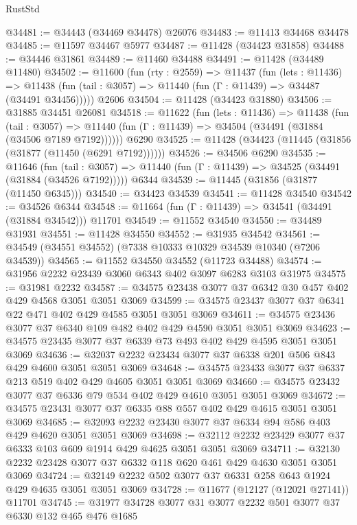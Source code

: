 \begin{lexlean}{RustStd}
\begin{coremodule}
@34481 := @34443 (@34469 @34478) @26076
@34483 := @11413 @34468 @34478
@34485 := @11597 @34467 @5977
@34487 := @11428 (@34423 @31858)
@34488 := @34446 @31861
@34489 := @11460 @34488
@34491 := @11428 (@34489 @11480)
@34502 := @11600
    (fun (rty : @2559) =>
    @11437
      (fun (lets : @11436) =>
      @11438 (fun (tail : @3057) => @11440 (fun (Γ : @11439) => @34487 (@34491 @34456)))))
    @2606
@34504 := @11428 (@34423 @31880)
@34506 := @31885 @34451 @26081
@34518 := @11622
    (fun (lets : @11436) =>
    @11438
      (fun (tail : @3057) =>
      @11440 (fun (Γ : @11439) => @34504 (@34491 (@31884 (@34506 @7189 @7192))))))
    @6290
@34525 := @11428 (@34423 (@11445 (@31856 (@31877 (@11450 (@6291 @7192))))))
@34526 := @34506 @6290
@34535 := @11646
    (fun (tail : @3057) => @11440 (fun (Γ : @11439) => @34525 (@34491 (@31884 (@34526 @7192)))))
    @6344
@34539 := @11445 (@31856 (@31877 (@11450 @6345)))
@34540 := @34423 @34539
@34541 := @11428 @34540
@34542 := @34526 @6344
@34548 := @11664 (fun (Γ : @11439) => @34541 (@34491 (@31884 @34542))) @11701
@34549 := @11552 @34540
@34550 := @34489 @31931
@34551 := @11428 @34550
@34552 := @31935 @34542
@34561 := @34549 (@34551 @34552) (@7338 @10333 @10329 @34539 @10340 (@7206 @34539))
@34565 := @11552 @34550 @34552 (@11723 @34488)
@34574 := @31956 @2232 @23439 @3060 @6343 @402 @3097 @6283 @3103 @31975
@34575 := @31981 @2232
@34587 := @34575 @23438 @3077 @37 @6342 @30 @457 @402 @429 @4568 @3051 @3051 @3069
@34599 := @34575 @23437 @3077 @37 @6341 @22 @471 @402 @429 @4585 @3051 @3051 @3069
@34611 := @34575 @23436 @3077 @37 @6340 @109 @482 @402 @429 @4590 @3051 @3051 @3069
@34623 := @34575 @23435 @3077 @37 @6339 @73 @493 @402 @429 @4595 @3051 @3051 @3069
@34636 := @32037 @2232 @23434 @3077 @37 @6338 @201 @506 @843 @429 @4600 @3051 @3051 @3069
@34648 := @34575 @23433 @3077 @37 @6337 @213 @519 @402 @429 @4605 @3051 @3051 @3069
@34660 := @34575 @23432 @3077 @37 @6336 @79 @534 @402 @429 @4610 @3051 @3051 @3069
@34672 := @34575 @23431 @3077 @37 @6335 @88 @557 @402 @429 @4615 @3051 @3051 @3069
@34685 := @32093 @2232 @23430 @3077 @37 @6334 @94 @586 @403 @429 @4620 @3051 @3051 @3069
@34698 := @32112 @2232 @23429 @3077 @37 @6333 @103 @609 @1914 @429 @4625 @3051 @3051 @3069
@34711 := @32130 @2232 @23428 @3077 @37 @6332 @118 @620 @461 @429 @4630 @3051 @3051 @3069
@34724 := @32149 @2232 @502 @3077 @37 @6331 @258 @643 @1924 @429 @4635 @3051 @3051 @3069
@34728 := @11677 (@12127 (@12021 @27141)) @11701
@34745 := @31977
    @34728
    @3077
    @31
    @3077
    @2232
    @501
    @3077
    @37
    @6330
    @132
    @465
    @476
    @1685

\end{coremodule}
\end{lexlean}
